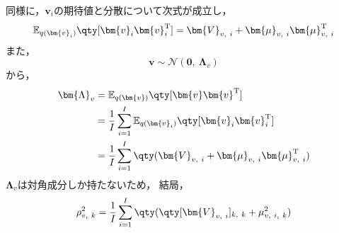 \documentclass[class=jsarticle, crop=false, dvipdfmx, fleqn]{standalone}
\begin{document}
同様に，\(\bm{v}_i\)の期待値と分散について次式が成立し，
\begin{equation}
    \mathbb{E}_{q(\bm{v}_i)} \qty[\bm{v}_i \bm{v}_i^\mathrm{T}] = \bm{V}_{v,\ i} + \bm{\mu}_{v,\ i} \bm{\mu}_{v,\ i}^\mathrm{T}
\end{equation}
また，
\begin{equation}
    \bm{v} \sim \mathcal{N}(\bm{0},\ \bm{\Lambda}_v)
\end{equation}
から，
\begin{align}
    \bm{\Lambda}_v
        & = \mathbb{E}_{q(\bm{v})} \qty[\bm{v} \bm{v}^\mathrm{T}] \\
        & = \frac{1}{I} \sum_{i=1}^{I} \mathbb{E}_{q(\bm{v}_i)} \qty[\bm{v}_i \bm{v}_i^\mathrm{T}] \\
        & = \frac{1}{I} \sum_{i=1}^{I} \qty(\bm{V}_{v,\ i} + \bm{\mu}_{v,\ i} \bm{\mu}_{v,\ i}^\mathrm{T})
\end{align}
\(\bm{\Lambda}_v\)は対角成分しか持たないため，
結局，
\begin{equation}
    \rho_{v,\ k}^2 = \frac{1}{I} \sum_{i=1}^{I} \qty(\qty[\bm{V}_{v,\ i}]_{k,\ k} + \mu_{v,\ i,\ k}^2)
\end{equation}
\end{document}

